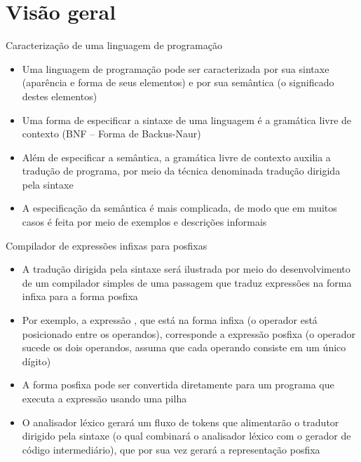 \section{Visão geral}

\begin{frame}[fragile]{Caracterização de uma linguagem de programação}

    \begin{itemize}
        \item Uma linguagem de programação pode ser caracterizada por sua sintaxe (aparência e forma de seus elementos) e por sua semântica (o significado destes
            elementos)
        \pause

        \item Uma forma de especificar a sintaxe de uma linguagem é a gramática livre de contexto (BNF -- Forma de Backus-Naur)
        \pause

        \item Além de especificar a semântica, a gramática livre de contexto auxilia a tradução de programa, por meio da técnica denominada tradução dirigida
            pela sintaxe
        \pause

        \item A especificação da semântica é mais complicada, de modo que em muitos casos é feita por meio de exemplos e descrições informais
    \end{itemize}

\end{frame}

\begin{frame}[fragile]{Compilador de expressões infixas para posfixas}

    \begin{itemize}
        \item A tradução dirigida pela sintaxe será ilustrada por meio do desenvolvimento de um compilador simples de uma passagem que traduz expressões
            na forma infixa para a forma posfixa
        \pause

        \item Por exemplo, a expressão , que está na forma infixa (o operador está posicionado entre os operandos), corresponde a expressão
            posfixa  (o operador sucede os dois operandos, assuma que cada operando consiste em um único dígito)
        \pause

        \item A forma posfixa pode ser convertida diretamente para um programa que executa a expressão usando uma pilha
        \pause

        \item O analisador léxico gerará um fluxo de tokens que alimentarão o tradutor dirigido pela sintaxe (o qual combinará o analisador léxico com o gerador
            de código intermediário), que por sua vez gerará a representação posfixa
    \end{itemize}

\end{frame}

